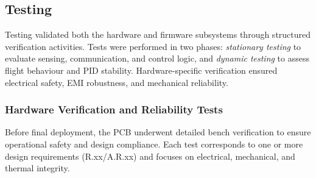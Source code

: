 \subsection{Testing}

Testing validated both the hardware and firmware subsystems through structured verification activities. Tests were performed in two phases: \textit{stationary testing} to evaluate sensing, communication, and control logic, and \textit{dynamic testing} to assess flight behaviour and PID stability. Hardware-specific verification ensured electrical safety, EMI robustness, and mechanical reliability.

\subsubsection{Hardware Verification and Reliability Tests}

Before final deployment, the PCB underwent detailed bench verification to ensure operational safety and design compliance. Each test corresponds to one or more design requirements (R.xx/A.R.xx) and focuses on electrical, mechanical, and thermal integrity.

